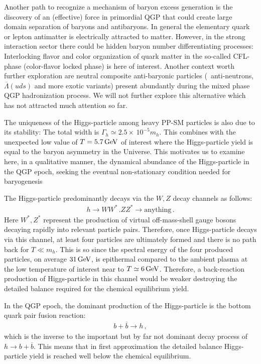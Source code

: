 {\color{blue}Another path to recognize a mechanism of baryon excess generation is the discovery of an (effective) force in primordial QGP that could create large domain separation of baryons and antibaryons. In general the elementary quark or lepton antimatter is electrically attracted to matter. However, in the strong interaction sector there could be hidden baryon number differentiating processes:  Interlocking flavor and color organization of quark matter in the so-called CFL-phase (color-flavor locked phase) \cite{Rajagopal:2000ff,Alford:2001zr,Kaplan:2001qk} is here of interest. Another context worth further exploration  are neutral composite anti-baryonic particles (\eg\ anti-neutrons, $\overline\Lambda(uds)$ and more exotic variants) present abundantly during the mixed phase QGP hadronization process. We will not further explore this alternative which has not attracted much attention so far. }


The  uniqueness of the Higgs-particle among heavy PP-SM particles is also due to its stability: The total width is $\Gamma_h\simeq 2.5\times\,10^{-5}m_h$. This combines with the unexpected low value of $T=5.7\text{\,GeV}$ of interest where the Higgs-particle yield is equal to the baryon asymmetry in the Universe. This motivates us to examine here, in a qualitative manner, the dynamical abundance of the Higgs-particle in the QGP epoch, seeking the eventual non-stationary condition needed for baryogenesis 

The Higgs-particle predominantly decays via the $W,Z$ decay channels as follows:
\begin{align}
h\longrightarrow WW^\ast\,. ZZ^\ast\longrightarrow\mathrm{anything}\,.
\end{align}
Here $W^\ast,Z^\ast$ represent the production of virtual off-mass-shell gauge bosons decaying rapidly into relevant particle pairs. Therefore, once Higgs-particle decays via this channel, at least four particles are ultimately formed and there is no path back for $T\ll m_h$. This is so since the spectral energy of the four produced particles, on average $31\text{\,GeV}$, is epithermal compared to the ambient plasma at the low temperature of interest near to $T\simeq 6\text{\,GeV}$. Therefore, a back-reaction production of Higgs-particle in this channel would be weaker destroying the detailed balance required for the chemical equilibrium yield. 

In the QGP epoch, the dominant production of the Higgs-particle is the bottom quark pair fusion reaction: 
\begin{align}
b+\overline{b}\longrightarrow h\,,
\end{align}
which is the inverse to the important but by far not dominant decay process of $h\to b+\overline{b}$. This means that in first approximation the detailed balance Higgs-particle yield is reached well below the chemical equilibrium.

